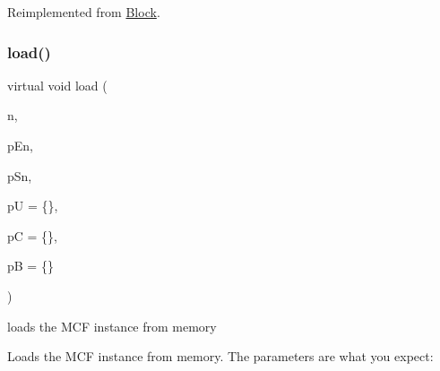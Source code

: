 Reimplemented from \mbox{\hyperlink{class_s_m_spp__di__unipi__it_1_1_block_a44ef42401ecae613574f3df619480de1}{Block}}.

\mbox{\label{class_s_m_spp__di__unipi__it_1_1_m_c_f_block_a8d9a0b09d14066840af26ec9189f6e03}} 
\subsubsection{\texorpdfstring{load()}{load()}\hspace{0.1cm}{\footnotesize\ttfamily [1/2]}}
{\footnotesize\ttfamily virtual void load (\begin{DoxyParamCaption}\item[{\mbox{\hyperlink{class_s_m_spp__di__unipi__it_1_1_m_c_f_block_aee6156e2ce80720d57a082d80f39d8cc}{c\+\_\+\+Index}}}]{n,  }\item[{\mbox{\hyperlink{class_s_m_spp__di__unipi__it_1_1_m_c_f_block_a03461123d4f6090aefeb97ef653d3f2b}{c\+\_\+\+Vec\+\_\+\+Index}} \&}]{p\+En,  }\item[{\mbox{\hyperlink{class_s_m_spp__di__unipi__it_1_1_m_c_f_block_a03461123d4f6090aefeb97ef653d3f2b}{c\+\_\+\+Vec\+\_\+\+Index}} \&}]{p\+Sn,  }\item[{\mbox{\hyperlink{class_s_m_spp__di__unipi__it_1_1_m_c_f_block_ae74990406673bbcdf64e1a3e3b680d5c}{c\+\_\+\+Vec\+\_\+\+F\+Number}} \&}]{pU = {\ttfamily \{\}},  }\item[{\mbox{\hyperlink{class_s_m_spp__di__unipi__it_1_1_m_c_f_block_ad42538e79f9abbdf18061bccc05edcd6}{c\+\_\+\+Vec\+\_\+\+C\+Number}} \&}]{pC = {\ttfamily \{\}},  }\item[{\mbox{\hyperlink{class_s_m_spp__di__unipi__it_1_1_m_c_f_block_ae74990406673bbcdf64e1a3e3b680d5c}{c\+\_\+\+Vec\+\_\+\+F\+Number}} \&}]{pB = {\ttfamily \{\}} }\end{DoxyParamCaption})\hspace{0.3cm}{\ttfamily [virtual]}}



loads the M\+CF instance from memory 

Loads the M\+CF instance from memory. The parameters are what you expect\+:


